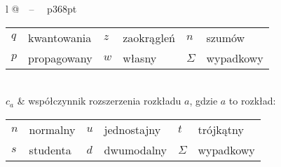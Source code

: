 \begin{longtable}[l]{ l @{~~--~~} p{368pt} }
\begin{tabular}{ *{3}{l @{~--~} l} }
                                  $q$ & kwantowania & $z$      & zaokrągleń & $n$      & szumów     \\
                                  $p$ & propagowany & $w$      & własny     & $\Sigma$ & wypadkowy
                                  \end{tabular} \\
$c_{a}$                         & współczynnik rozszerzenia rozkładu $a$, gdzie $a$ to rozkład: \newline
                                  \begin{tabular}{ *{3}{l @{~--~} l} }
                                  $n$ & normalny    & $u$      & jednostajny & $t$      & trójkątny  \\
                                  $s$ & studenta    & $d$      & dwumodalny  & $\Sigma$ & wypadkowy
                                  \end{tabular} \\
\end{longtable}
